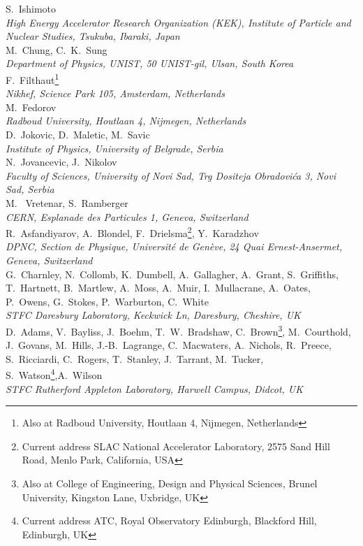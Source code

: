 S.~Ishimoto
\\{\it
High Energy Accelerator Research Organization (KEK), Institute of Particle and Nuclear Studies, Tsukuba, Ibaraki, Japan
}\\


M.~Chung, C.~K.~Sung
\\{\it 
Department of Physics, UNIST, 50 UNIST-gil, Ulsan, South Korea
}\\

F.~Filthaut\footnote{Also at Radboud University, Houtlaan 4, Nijmegen, Netherlands}
\\{\it
Nikhef, Science Park 105, Amsterdam, Netherlands
}\\

M.~Fedorov
\\{\it
Radboud University, Houtlaan 4, Nijmegen, Netherlands
}\\

D.~Jokovic, D.~Maletic, M.~Savic
\\{\it
Institute of Physics, University of Belgrade, Serbia
}\\


N.~Jovancevic, J.~Nikolov
\\{\it
Faculty of Sciences, University of Novi Sad, Trg Dositeja Obradovi\'{c}a 3, Novi Sad, Serbia
}\\

M. ~Vretenar, S.~Ramberger
\\{\it
CERN, Esplanade des Particules 1, Geneva, Switzerland
}\\

R.~Asfandiyarov, A.~Blondel, F.~Drielsma\footnote{Current address SLAC National Accelerator Laboratory, 2575 Sand Hill Road, Menlo Park, California, USA}, Y.~Karadzhov 
\\{\it
DPNC, Section de Physique, Universit\'e de Gen\`eve, 24 Quai Ernest-Ansermet, Geneva, Switzerland
}\\

G.~Charnley, N.~Collomb,  K.~Dumbell, A.~Gallagher, A.~Grant, S.~Griffiths,  T.~Hartnett, B.~Martlew, 
A.~Moss, A.~Muir, I.~Mullacrane, A.~Oates, P.~Owens, G.~Stokes, P.~Warburton, C.~White
\\{\it
STFC Daresbury Laboratory, Keckwick Ln, Daresbury, Cheshire, UK
}\\

D.~Adams,   V.~Bayliss, J.~Boehm, T.~W.~Bradshaw, C.~Brown\footnote{Also at College of Engineering, Design and Physical Sciences, Brunel University, Kingston Lane, Uxbridge, UK}, M.~Courthold,  J.~Govans, M.~Hills, J.-B.~Lagrange, C.~Macwaters, A.~Nichols, R.~Preece, S.~Ricciardi, C.~Rogers, T.~Stanley, J.~Tarrant,  
M.~Tucker, S.~Watson\footnote{Current address ATC, Royal Observatory Edinburgh, Blackford Hill, Edinburgh, UK},A.~Wilson
\\{\it
STFC Rutherford Appleton Laboratory, Harwell Campus, Didcot, UK
}\\

